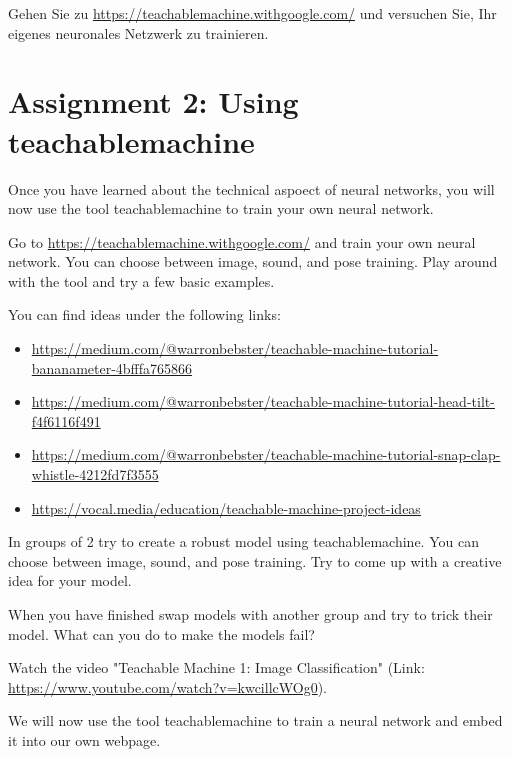 \documentclass[12pt,a4paper]{report}
\begin{document}
\begin{ex}
     Gehen Sie zu \url{https://teachablemachine.withgoogle.com/} und versuchen Sie, Ihr eigenes neuronales Netzwerk zu trainieren.
\end{ex}


\newpage

\section*{Assignment 2: Using teachablemachine}
Once you have learned about the technical aspoect of neural networks, you will now use the tool teachablemachine to train your own neural network.


\begin{ex}
    Go to \url{https://teachablemachine.withgoogle.com/} and train your own neural network. You can choose between image, sound, and pose training. Play around with the tool and try a few basic examples.

    You can find ideas under the following links:
    \begin{itemize}
     \item \url{https://medium.com/@warronbebster/teachable-machine-tutorial-bananameter-4bfffa765866}
     \item \url{https://medium.com/@warronbebster/teachable-machine-tutorial-head-tilt-f4f6116f491}
     \item \url{https://medium.com/@warronbebster/teachable-machine-tutorial-snap-clap-whistle-4212fd7f3555}
     \item \url{https://vocal.media/education/teachable-machine-project-ideas} 
    \end{itemize}
\end{ex}

\begin{ex}
      In groups of 2 try to create a robust model using teachablemachine. You can choose between image, sound, and pose training. Try to come up with a creative idea for your model.

      When you have finished swap models with another group and try to trick their model. What can you do to make the models fail?
\end{ex}

\begin{ex}
      Watch the video "Teachable Machine 1: Image Classification" (Link: \url{https://www.youtube.com/watch?v=kwcillcWOg0}).
\end{ex}

We will now use the tool teachablemachine to train a neural network and embed it into our own webpage.
\end{document}
